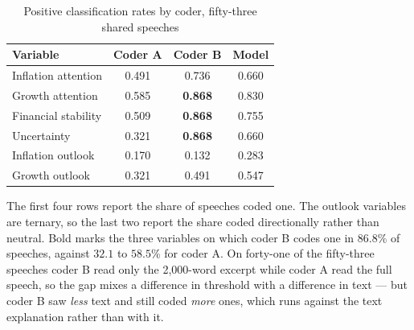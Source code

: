 \begin{table}[htbp]
\centering
\caption{Positive classification rates by coder, fifty-three shared speeches}
\label{tab:base-rates}
\begin{tabular}{lccc}
\toprule
Variable & Coder A & Coder B & Model \\
\midrule
Inflation attention & 0.491 & 0.736 & 0.660 \\
Growth attention & 0.585 & \textbf{0.868} & 0.830 \\
Financial stability & 0.509 & \textbf{0.868} & 0.755 \\
Uncertainty & 0.321 & \textbf{0.868} & 0.660 \\
\addlinespace
Inflation outlook & 0.170 & 0.132 & 0.283 \\
Growth outlook & 0.321 & 0.491 & 0.547 \\
\bottomrule
\end{tabular}

\vspace{0.5em}
\begin{minipage}{0.9\textwidth}
{\footnotesize The first four rows report the share of speeches coded one. The outlook variables are ternary, so the last two report the share coded directionally rather than neutral. Bold marks the three variables on which coder B codes one in $86.8\%$ of speeches, against $32.1$ to $58.5\%$ for coder A. On forty-one of the fifty-three speeches coder B read only the 2,000-word excerpt while coder A read the full speech, so the gap mixes a difference in threshold with a difference in text --- but coder B saw \emph{less} text and still coded \emph{more} ones, which runs against the text explanation rather than with it.}
\end{minipage}
\end{table}
